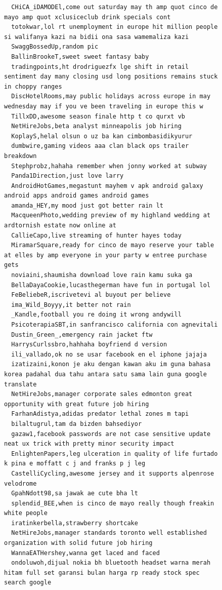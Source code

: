 \begin{figure}[htpb]
\begin{verbatim}
  CHiCA_iDAMODEl,come out saturday may th amp quot cinco de mayo amp quot xclusiceclub drink specials cont
  totokwar,lol rt unemployment in europe hit million people si walifanya kazi na bidii ona sasa wamemaliza kazi
  SwaggBossedUp,random pic
  BallinBrookeT,sweet sweet fantasy baby
  tradingpoints,ht drodriguezfx lge shift in retail sentiment day many closing usd long positions remains stuck in choppy ranges
  DiscHotelRooms,may public holidays across europe in may wednesday may if you ve been traveling in europe this w
  TillxDD,awesome season finale http t co qurxt vb
  NetHireJobs,beta analyst minneapolis job hiring
  KoplayS,helal olsun o uz ba kan cimbombasidikyurur
  dumbwire,gaming videos aaa clan black ops trailer breakdown
  Stephprobz,hahaha remember when jonny worked at subway
  Panda1Direction,just love larry
  AndroidHotGames,megastunt mayhem v apk android galaxy android apps android games android games
  amanda_HEY,my mood just got better rain lt
  MacqueenPhoto,wedding preview of my highland wedding at ardtornish estate now online at
  CallieCapo,live streaming of hunter hayes today
  MiramarSquare,ready for cinco de mayo reserve your table at elles by amp everyone in your party w entree purchase gets
  noviaini,shaumisha download love rain kamu suka ga
  BellaDayaCookie,lucasthegerman have fun in portugal lol
  FeBeliebeR,iscrivetevi al buyout per believe
  ima_Wild_Boyyy,it better not rain
  _Kandle,football you re doing it wrong andywill
  PsicoterapiaSBT,in sanfrancisco california con agnevitali
  Dustin_Green_,emergency rain jacket ftw
  HarrysCurlssbro,hahhaha boyfriend d version
  ili_vallado,ok no se usar facebook en el iphone jajaja
  izatizaini,konon je aku dengan kawan aku im guna bahasa korea padahal dua tahu antara satu sama lain guna google translate
  NetHireJobs,manager corporate sales edmonton great opportunity with great future job hiring
  FarhanAdistya,adidas predator lethal zones m tapi
  bilaltugrul,tam da bizden bahsediyor
  gazaw1,facebook passwords are not case sensitive update neat ux trick with pretty minor security impact
  EnlightenPapers,leg ulceration in quality of life furtado k pina e moffatt c j and franks p j leg
  CastelliCycling,awesome jersey and it supports alpenrose velodrome
  GpahNdott98,sa jawak ae cute bha lt
  splendid_BEE,when is cinco de mayo really though freakin white people
  iratinkerbella,strawberry shortcake
  NetHireJobs,manager standards toronto well established organization with solid future job hiring
  WannaEATHershey,wanna get laced and faced
  ondoluwoh,dijual nokia bh bluetooth headset warna merah hitam full set garansi bulan harga rp ready stock spec search google

\end{verbatim}
\end{figure}
